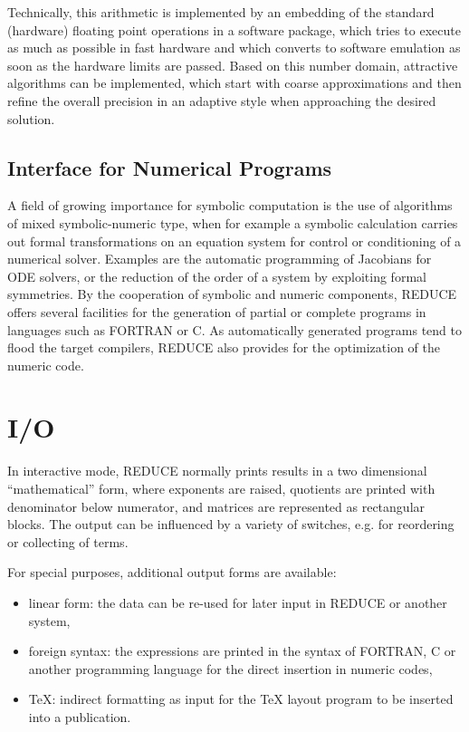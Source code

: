 Technically, this arithmetic is implemented by an embedding of the
standard (hardware) floating point operations in a software package, which
tries to execute as much as possible in fast hardware and which converts
to software emulation as soon as the hardware limits are passed.  Based on
this number domain, attractive algorithms can be implemented, which start
with coarse approximations and then refine the overall precision in an
adaptive style when approaching the desired solution.

\subsection{Interface for Numerical Programs}
 
A field of growing importance for symbolic computation is the use of
algorithms of mixed symbolic-numeric type, when for example a symbolic
calculation carries out formal transformations on an equation system for
control or conditioning of a numerical solver.  Examples are the automatic
programming of Jacobians for ODE solvers, or the reduction of the order of
a system by exploiting formal symmetries.  By the cooperation of symbolic
and numeric components, {\small REDUCE} offers several facilities for the
generation of partial or complete programs in languages such as FORTRAN or
C.  As automatically generated programs tend to flood the target
compilers, {\small REDUCE} also provides for the optimization of the
numeric code.
\section{I/O}
 
In interactive mode, {\small REDUCE} normally prints results in a two
dimensional ``mathematical'' form, where exponents are raised, quotients
are printed with denominator below numerator, and matrices are represented
as rectangular blocks.  The output can be influenced by a variety of
switches, e.g. for reordering or collecting of terms.

For special purposes, additional output forms are available:
 
\begin{itemize}
\item linear form: the data can be re-used for later
input in {\small REDUCE} or another system,
\item foreign syntax: the expressions are printed in
the syntax of FORTRAN, C or another programming language
for the direct insertion in numeric codes,
\item TeX: indirect formatting as input for the TeX
layout program to be inserted into a publication.
\end{itemize}
 

